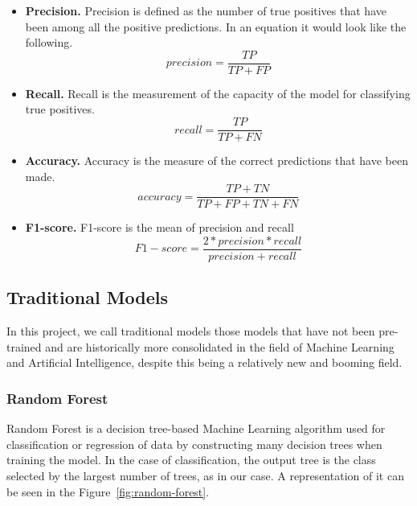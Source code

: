\begin{itemize}
    \item \textbf{Precision.} Precision is defined as the number of true positives that have been among all the positive predictions. In an equation it would look like the following.
    \begin{equation}
        precision = \frac{TP}{TP + FP} 
    \end{equation}
    \item \textbf{Recall.} Recall is the measurement of the capacity of the model for classifying true positives.
    \begin{equation}
        recall = \frac{TP}{TP + FN} 
    \end{equation}
    \item \textbf{Accuracy.} Accuracy is the measure of the correct predictions that have been made.
    \begin{equation}
        accuracy = \frac{TP + TN}{TP + FP + TN + FN} 
    \end{equation}
    \item \textbf{F1-score.} F1-score is the mean of precision and recall
    \begin{equation}
        F1-score = \frac{2 * precision * recall}{precision + recall} 
    \end{equation}
    
\end{itemize}

\label{sec:models}
\subsection{Traditional Models}
In this project, we call traditional models those models that have not been pre-trained and are historically more consolidated in the field of Machine Learning and Artificial Intelligence, despite this being a relatively new and booming field.

\subsubsection{Random Forest}
Random Forest is a decision tree-based Machine Learning algorithm used for classification or regression of data by constructing many decision trees when training the model. In the case of classification, the output tree is the class selected by the largest number of trees, as in our case. A representation of it can be seen in the Figure~\ref{fig:random-forest}.

